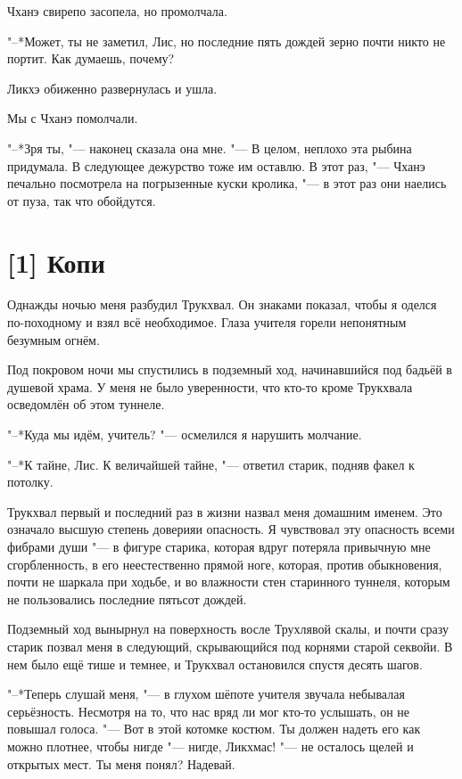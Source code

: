 Чханэ свирепо засопела, но промолчала.

"--*Может, ты не заметил, Лис, но последние пять дождей зерно почти никто не портит.
Как думаешь, почему?

Ликхэ обиженно развернулась и ушла.

Мы с Чханэ помолчали.

"--*Зря ты, "--- наконец сказала она мне.
"--- В целом, неплохо эта рыбина придумала.
В следующее дежурство тоже им оставлю.
В этот раз, "--- Чханэ печально посмотрела на погрызенные куски кролика, "--- в этот раз они наелись от пуза, так что обойдутся.

\section{[1] Копи}

Однажды ночью меня разбудил Трукхвал.
Он знаками показал, чтобы я оделся по-походному и взял всё необходимое.
Глаза учителя горели непонятным безумным огнём.

Под покровом ночи мы спустились в подземный ход, начинавшийся под бадьёй в душевой храма.
У меня не было уверенности, что кто-то кроме Трукхвала осведомлён об этом туннеле.

"--*Куда мы идём, учитель? "--- осмелился я нарушить молчание.

"--*К тайне, Лис.
К величайшей тайне, "--- ответил старик, подняв факел к потолку.

Трукхвал первый и последний раз в жизни назвал меня домашним именем.
Это означало высшую степень доверия\ldotst и опасность.
Я чувствовал эту опасность всеми фибрами души "--- в фигуре старика, которая вдруг потеряла привычную мне сгорбленность, в его неестественно прямой ноге, которая, против обыкновения, почти не шаркала при ходьбе, и во влажности стен старинного туннеля, которым не пользовались последние пятьсот дождей.

Подземный ход вынырнул на поверхность восле Трухлявой скалы, и почти сразу старик позвал меня в следующий, скрывающийся под корнями старой секвойи.
В нем было ещё тише и темнее, и Трукхвал остановился спустя десять шагов.

"--*Теперь слушай меня, "--- в глухом шёпоте учителя звучала небывалая серьёзность.
Несмотря на то, что нас вряд ли мог кто-то услышать, он не повышал голоса.
"--- Вот в этой котомке костюм.
Ты должен надеть его как можно плотнее, чтобы нигде "--- нигде, Ликхмас! "--- не осталось щелей и открытых мест.
Ты меня понял?
Надевай.

